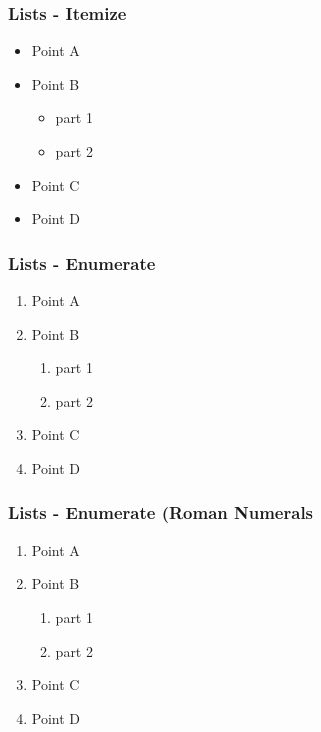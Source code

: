 \begin{frame}\frametitle{Lists - Itemize}

\begin{itemize}
\item Point A
\item Point B
\begin{itemize}
\item part 1
\item part 2
\end{itemize}
\item Point C
\item Point D
\end{itemize}

\end{frame}

\begin{frame}\frametitle{Lists - Enumerate}

\begin{enumerate}
\item Point A
\item Point B
\begin{enumerate}
\item part 1
\item part 2
\end{enumerate}
\item Point C
\item Point D
\end{enumerate}

\end{frame}

\begin{frame}\frametitle{Lists - Enumerate (Roman Numerals}

\begin{enumerate} [I]
\item Point A
\item Point B
\begin{enumerate} [i]
\item part 1
\item part 2
\end{enumerate}
\item Point C
\item Point D
\end{enumerate}

\end{frame}